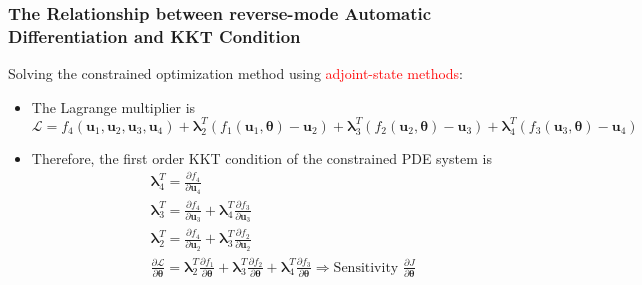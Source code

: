 \documentclass{beamer}
\newcommand{\bt}[0]{\bm{\theta}}
\begin{document}
	
	\begin{frame}
\frametitle{The  Relationship between reverse-mode Automatic Differentiation and KKT Condition}

Solving the constrained optimization method using \textcolor{red}{adjoint-state methods}:

\begin{itemize}
	\item The Lagrange multiplier is 
	{\footnotesize $$ \mathcal{L} = f_4(\mathbf{u}_1, \mathbf{u}_2, \mathbf{u}_3, \mathbf{u}_4) + \bm{\lambda}^{T}_{2}(f_1(\mathbf{u}_1, \bm {\theta}) - \mathbf{u}_2) + \bm{\lambda}^T_{3}(f_2(\mathbf{u}_2, \bm {\theta}) - \mathbf{u}_3) + \bm{\lambda}^T_{4}(f_3(\mathbf{u}_3, \bm {\theta}) - \mathbf{u}_4)$$}
	\item Therefore, the first order KKT condition of the constrained PDE system is 
\begin{eqnarray*}
 && \bm{\lambda}_4^T = \frac{\partial f_4}{\partial \mathbf{u}_4} \nonumber \\
 && \bm{\lambda}_3^T = \frac{\partial f_4}{\partial  \mathbf{u}_3} + \bm{\lambda}_4^T\frac{\partial f_3}{\partial  \mathbf{u}_3} \nonumber \\
 && \bm{\lambda}_2^T = \frac{\partial f_4}{\partial  \mathbf{u}_2} + \bm{\lambda}_3^T\frac{\partial f_2}{\partial  \mathbf{u}_2} \nonumber \\
 && \frac{\partial \mathcal{L}}{\partial \bm{\theta}} = \bm{\lambda}_2^T\frac{\partial f_1}{\partial \bm{\theta}} + \bm{\lambda}_3^T\frac{\partial f_2}{\partial \bm{\theta}} + \bm{\lambda}_4^T\frac{\partial f_3}{\partial \bm{\theta}} \Rightarrow \mbox{Sensitivity $\frac{\partial J}{\partial \bt}$}
\end{eqnarray*}
\end{itemize}

	 
	 
	 
	 
\end{frame}
\end{document}
